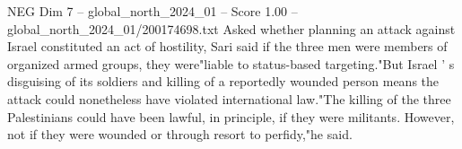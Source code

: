 \begin{textsample}{NEG Dim 7 – global\_north\_2024\_01 – Score 1.00 – global\_north\_2024\_01/200174698.txt}
Asked whether planning an attack against Israel constituted an act of hostility, Sari said if the three men were members of organized armed groups, they were"liable to status-based targeting."But Israel ' s disguising of its soldiers and killing of a reportedly wounded person means the attack could nonetheless have violated international law."The killing of the three Palestinians could have been lawful, in principle, if they were militants.
However, not if they were wounded or through resort to perfidy,"he said.

\end{textsample}
